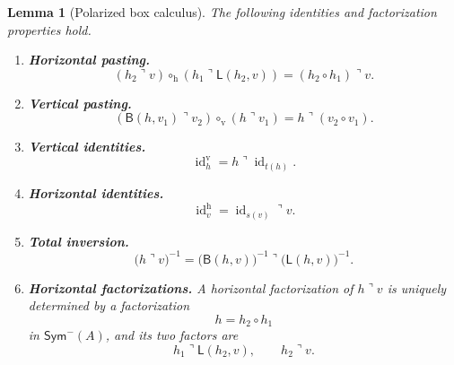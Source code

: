 \documentclass[oneside]{article}
\newcommand{\Sym}{\mathsf{Sym}}
\newcommand{\id}{\operatorname{id}}
\newcommand{\trcorner}{\mathbin{\urcorner}}
\newcommand{\leftedge}[2]{\mathsf{L}(#1,#2)}
\newcommand{\bottomedge}[2]{\mathsf{B}(#1,#2)}
\theoremstyle{plain}
\newtheorem{lemma}[theorem]{Lemma}
\theoremstyle{definition}
\theoremstyle{remark}
\begin{document}
\begin{lemma}[Polarized box calculus]
\label{lem:cgqg-vacant-cell-calculus}
    The following identities and factorization properties hold.
    \begin{enumerate}
        \item \textbf{Horizontal pasting.}
        \begin{equation}
            (h_2\trcorner v)
            \circ_{\mathrm h}
            (h_1\trcorner\leftedge{h_2}{v})
            =
            (h_2\circ h_1)\trcorner v.
            \label{eq:cgqg-vacant-cell-horizontal}
        \end{equation}

        \item \textbf{Vertical pasting.}
        \begin{equation}
            (\bottomedge{h}{v_1}\trcorner v_2)
            \circ_{\mathrm v}
            (h\trcorner v_1)
            =
            h\trcorner(v_2\circ v_1).
            \label{eq:cgqg-vacant-cell-vertical}
        \end{equation}

        \item \textbf{Vertical identities.}
        \begin{equation}
            \id_h^{\mathrm v}
            =
            h\trcorner\id_{t(h)}.
            \label{eq:cgqg-vacant-cell-identities}
        \end{equation}

        \item \textbf{Horizontal identities.}
        \begin{equation}
            \id_v^{\mathrm h}
            =
            \id_{s(v)}\trcorner v.
            \label{eq:cgqg-vacant-cell-horizontal-identity}
        \end{equation}

        \item \textbf{Total inversion.}
        \begin{equation}
            \bigl(h\trcorner v\bigr)^{-1}
            =
            \bigl(\bottomedge{h}{v}\bigr)^{-1}
            \trcorner
            \bigl(\leftedge{h}{v}\bigr)^{-1}.
            \label{eq:cgqg-vacant-cell-inversion}
        \end{equation}

        \item \textbf{Horizontal factorizations.} A horizontal factorization of \(h\trcorner v\) is uniquely determined by a factorization
        \[
            h=h_2\circ h_1
        \]
        in \(\Sym^-(A)\), and its two factors are
        \begin{equation}
            h_1\trcorner\leftedge{h_2}{v},
            \qquad
            h_2\trcorner v.
            \label{eq:cgqg-vacant-cell-horizontal-factorization}
        \end{equation}


\end{enumerate}
\end{lemma}
\end{document}
